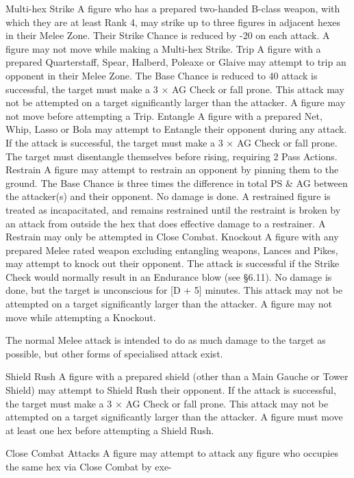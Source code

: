 \documentclass[a4paper]{article}
\begin{document}
\begin{multicols}{3}
Multi-hex Strike A figure who has a prepared
two-handed B-class weapon, with which they are at
least Rank 4, may strike up to three figures in
adjacent hexes in their Melee Zone. Their Strike
Chance is reduced by -20 on each attack. A figure
may not move while making a Multi-hex Strike.
Trip A figure with a prepared Quarterstaff, Spear,
Halberd, Poleaxe or Glaive may attempt to trip an
opponent in their Melee Zone. The Base Chance is
reduced to 40%
attack is successful, the target must make a 3 × AG
Check or fall prone. This attack may not be attempted on a target significantly larger than the
attacker. A figure may not move before attempting
a Trip.
Entangle A figure with a prepared Net, Whip,
Lasso or Bola may attempt to Entangle their opponent during any attack. If the attack is successful,
the target must make a 3 × AG Check or fall prone.
The target must disentangle themselves before
rising, requiring 2 Pass Actions.
Restrain A figure may attempt to restrain an opponent by pinning them to the ground. The Base
Chance is three times the difference in total PS &
AG between the attacker(s) and their opponent. No
damage is done. A restrained figure is treated as
incapacitated, and remains restrained until the
restraint is broken by an attack from outside the
hex that does effective damage to a restrainer. A
Restrain may only be attempted in Close Combat.
Knockout A figure with any prepared Melee rated
weapon excluding entangling weapons, Lances and
Pikes, may attempt to knock out their opponent.
The attack is successful if the Strike Check would
normally result in an Endurance blow (see §6.11).
No damage is done, but the target is unconscious
for [D + 5] minutes. This attack may not be attempted on a target significantly larger than the
attacker. A figure may not move while attempting
a Knockout.

The normal Melee attack is intended to do as much
damage to the target as possible, but other forms of
specialised attack exist.

Shield Rush A figure with a prepared shield (other
than a Main Gauche or Tower Shield) may attempt
to Shield Rush their opponent. If the attack is successful, the target must make a 3 × AG Check or
fall prone. This attack may not be attempted on a
target significantly larger than the attacker. A
figure must move at least one hex before attempting a Shield Rush.

Close Combat Attacks
A figure may attempt to attack any figure who
occupies the same hex via Close Combat by exe-


\end{multicols}
\end{document}
